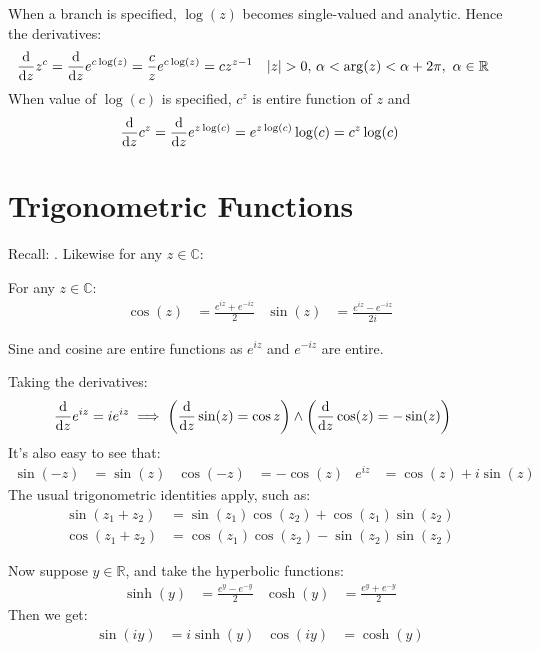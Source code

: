 \documentclass[12pt, english]{book}
\begin{document}
	When a branch is specified, \(\log(z)\) becomes single-valued and analytic. Hence the derivatives: 
	\begin{align*}
		\dv{z} z^c &= \dv{z} e^{c\log(z)} = \frac{c}{z} e^{c \log(z)} = cz^{z-1}
		& \abs{z}>0,& \ \alpha < \arg(z) < \alpha + 2 \pi, \ \alpha \in \mathbb{R}
	\end{align*}
	When value of \(\log(c)\) is specified, \(c^z\) is entire function of \(z\) and
	\begin{align*}
		\dv{z}c^z = \dv{z}e^{z\log(c)} = e^{z\log(c)} \log(c) = c^z \log(c)
	\end{align*}
	
	\section{Trigonometric Functions} \label{Trigonometric Functions Section - Complex}
	
	Recall: . Likewise for any \(z \in \mathbb{C}\):
	
	\begin{definition}
		\label{Sine and Cosine Functions - Complex}
		For any \(z \in \mathbb{C}\):
		\begin{align*}
			\cos(z) &= \frac{e^{iz} + e^{-iz}}{2} &
			\sin(z) &= \frac{e^{iz} - e^{-iz}}{2i} 
		\end{align*}
	\end{definition}
	Sine and cosine are entire functions as \(e^{iz}\) and \(e^{-iz}\) are entire.
	
	Taking the derivatives:
	\begin{align*}
		\dv{z} e^{iz} = ie^{iz}
		&\implies \left(\dv{z} \sin(z) = \cos{z} \right) \land \left( \dv{z} \cos(z) = -\sin(z)\right)
	\end{align*}
	It's also easy to see that:
	\begin{align*}
		\sin(-z) &= \sin(z)  & \cos(-z) &= -\cos(z) & e^{iz} &= \cos(z) + i\sin(z)
	\end{align*}
	The usual trigonometric identities apply, such as: 
	\begin{align*}
		\sin(z_1 + z_2) &= \sin(z_1) \cos(z_2) + \cos(z_1) \sin(z_2) \\
		\cos(z_1 + z_2) &= \cos(z_1) \cos(z_2) - \sin(z_2) \sin(z_2)
	\end{align*}
	
	Now suppose \(y \in \mathbb{R}\), and take the hyperbolic functions:
	\begin{align*}
		\sinh(y) &= \frac{e^y - e^{-y}}{2} & \cosh(y) &= \frac{e^y + e^{-y}}{2}
	\end{align*}
	Then we get: 
	\begin{align*}
		\sin(iy) &= i\sinh(y) & \cos(iy) &= \cosh(y)
	\end{align*}
\end{document}
